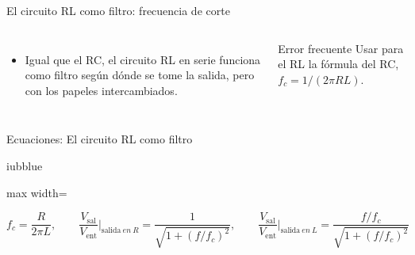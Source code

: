 \documentclass[aspectratio=169,11pt,xcolor={table}]{beamer}
\begin{document}
\begin{frame}{El circuito RL como filtro: frecuencia de corte}
\begin{columns}[c,onlytextwidth]
\small
\begin{itemize}\setlength{\itemsep}{4pt}
  \item Igual que el RC, el circuito RL en serie funciona como filtro según dónde se tome la salida, pero con los papeles intercambiados.
\end{itemize}
\begin{cardO}{Error frecuente}
\footnotesize Usar para el RL la fórmula del RC, $f_c = 1/(2\pi R L)$.
\end{cardO}
\end{columns}
\end{frame}

\begin{frame}{Ecuaciones: El circuito RL como filtro}
\begin{cajaplana}{iubblue}
\centering
\begin{adjustbox}{max width=\linewidth}
\begin{minipage}{2.00\linewidth}
{\large
\begin{equation*}
  f_c = \frac{R}{2\pi L}, \qquad \frac{V_{\mathrm{sal}}}{V_{\mathrm{ent}}}\bigg|_{\text{salida}\ en\ R} = \frac{1}{\sqrt{1 + (f/f_c)^{2}}}, \qquad \frac{V_{\mathrm{sal}}}{V_{\mathrm{ent}}}\bigg|_{\text{salida}\ en\ L} = \frac{f/f_c}{\sqrt{1 + (f/f_c)^{2}}}
\end{equation*}
}
\end{minipage}
\end{adjustbox}
\end{cajaplana}
\end{frame}
\end{document}
